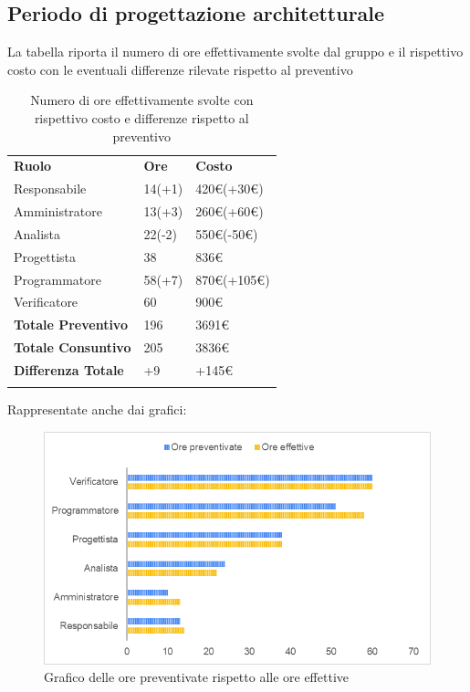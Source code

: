 		\pagebreak
		\subsection{Periodo di progettazione architetturale}
		La tabella riporta il numero di ore effettivamente svolte dal gruppo e il rispettivo costo con le eventuali differenze rilevate rispetto al preventivo
		\begin{longtable} {							
				>{}p{40mm}  
				>{}p{20mm}	
				>{}p{28mm}			
			}			
			\rowcolor{gray!50}
			
			\textbf{Ruolo} & \textbf{Ore} & \textbf{Costo} \TBstrut \\
			Responsabile & 14(+1) & 420\euro (+30\euro) \TBstrut \\
			Amministratore & 13(+3) & 260\euro (+60\euro)\TBstrut \\
			Analista & 22(-2) & 550\euro (-50\euro) \TBstrut \\
			Progettista & 38 & 836\euro \TBstrut \\
			Programmatore & 58(+7) & 870\euro (+105\euro) \TBstrut \\
			Verificatore & 60 & 900\euro \TBstrut \\
			\textbf{Totale Preventivo} & 196 & 3691\euro	\TBstrut \\	
			\textbf{Totale Consuntivo} & 205 & 3836\euro	\TBstrut \\	
			\textbf{Differenza Totale} & +9 & +145\euro \TBstrut \\
			\rowcolor{white}
			\caption{Numero di ore effettivamente svolte con rispettivo costo e differenze rispetto al preventivo}	
		\end{longtable}
		Rappresentate anche dai grafici:
		\begin{figure} [H]
			\includegraphics[width=\linewidth]{./img/Grafici/15.png}
			\caption{Grafico delle ore preventivate rispetto alle ore effettive}
		\end{figure}
		
